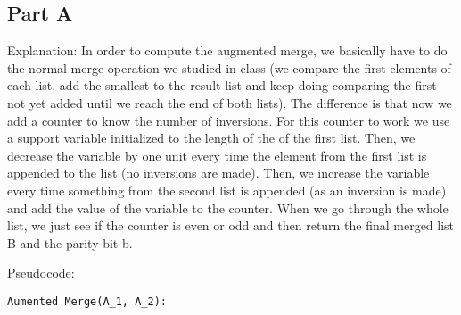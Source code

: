 \documentclass[12pt,twoside]{article}
\begin{document}

\begin{problems}

\section*{Part A}

\problem  %

\begin{problemparts}
\problempart  %
\problempart  %
\problempart  %
\problempart  %
\problempart  %
\end{problemparts}

\problem  %

\begin{problemparts}

\problempart %
 
 \vspace{2mm}
 
 Explanation: In order to compute the augmented merge, we basically have to do the normal merge operation we studied in class (we compare the first elements of each list, add the smallest to the result list and keep doing comparing the first not yet added until we reach the end of both lists). The difference is that now we add a counter to know the number of inversions. For this counter to work we use a support variable initialized to the length of the of the first list. Then, we decrease the variable by one unit every time the element from the first list is appended to the list (no inversions are made). Then, we increase the variable every time something from the second list is appended (as an inversion is made) and add the value of the variable to the counter. When we go through the whole list, we just see if the counter is even or odd and then return the final merged list B and the parity bit b.
 
\vspace{2mm}

 Pseudocode:
 
 \begin{verbatim}
Aumented Merge(A_1, A_2):


\end{verbatim}
\end{problemparts}
\end{problems}
\end{document}
